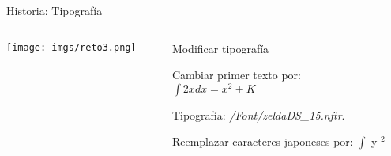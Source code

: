 \begin{frame}{Historia: Tipografía}
    \begin{columns}
    \begin{column}{0.3\textwidth}
        \texttt{[image: imgs/reto3.png]}
    \end{column}
    \begin{column}{0.7\textwidth}
        Modificar tipografía
        \footnotesize
        \begin{wideitemize}
            \item Cambiar primer texto por:\\
                  $\int2x dx=x^2+K$
            \item Tipografía: \textit{/Font/zeldaDS\_15.nftr}.
            \item Reemplazar caracteres japoneses por: $\int$ y $^2$
        \end{wideitemize}
    \end{column}
    \end{columns}
\end{frame}

